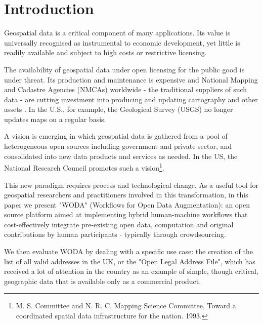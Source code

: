 \section{Introduction}
\label{introduction}

Geospatial data is a critical component of many applications. Its value is universally recognised as instrumental to economic development, yet little is readily available and subject to high costs or restrictive licensing. 

The availability of geospatial data under open licensing for the public good is under threat. Its production and maintenance is expensive and National Mapping and Cadastre Agencies (NMCAs) worldwide - the traditional suppliers of such data - are cutting investment into producing and updating cartography and other assets \cite{ESTES:1994vz}. In the U.S., for example, the Geological Survey (USGS) no longer updates maps on a regular basis. 

A vision is emerging in which geospatial data is gathered from a pool of heterogeneous open sources including government and private sector, and consolidated into new data products and services as needed. In the US, the National Research Council promotes such a vision\footnote{M. S. Committee and N. R. C. Mapping Science Committee, Toward a coordinated spatial data infrastructure for the nation. 1993.}.

This new paradigm requires process and technological change. As a useful tool for geospatial researchers and practitioners involved in this transformation, in this paper we present "WODA" (Workflows for Open Data Augmentation): an open source platform aimed at implementing hybrid human-machine workflows that cost-effectively integrate pre-existing open data, computation and original contributions by human participants - typically through crowdsourcing. 

We then evaluate WODA by dealing with a specific use case: the creation of the list of all valid addresses in the UK, or the "Open Legal Address File", which has received a lot of attention in the country as an example of simple, though critical, geographic data that is available only as a commercial product.

